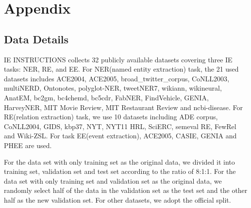 \section{Appendix}
\label{sec:appendix}
\subsection{Data Details}
\label{data details}
IE INSTRUCTIONS collects 32 publicly available datasets covering three IE tasks: NER, RE, and EE.
For NER(named entity extraction) task, the 21 used datasets includes ACE2004, ACE2005\cite{ACE2005DATASET}, broad\_twitter\_corpus\cite{broad_twitter_corpusDATASET}, CoNLL2003\cite{CoNLL03Dataset}, multiNERD\cite{multiNERDDATASET}, Ontonotes\cite{OntoNotesDataset}, polyglot-NER\cite{polyglot-NERDATASET}, tweetNER7\cite{tweetNER7DATASET}, wikiann\cite{wikiannDataset}, wikineural\cite{wikineuralDATASET}, AnatEM\cite{AnatEM}, bc2gm\cite{Kocaman2020BiomedicalNE}, bc4chemd\cite{bc4chemdDATASET}, bc5cdr\cite{Li2016BioCreativeVC}, FabNER\cite{Kumar2021FabNERIE}, FindVehicle\cite{FindVehicle}, GENIA\cite{GENIANERDATASET}, HarveyNER\cite{HarveyNERDATASET}, MIT Movie Review\cite{MITReviewDataset}, MIT Restaurant Review\cite{MITReviewDataset} and ncbi-disease\cite{ncbi-diseaseDATASET}. For RE(relation extraction) task, we use 10 datasets including ADE corpus\cite{ADEcorpusDATASET}, CoNLL2004\cite{Roth2004ALP}, GIDS\cite{Jat2018ImprovingDS}, kbp37\cite{kbp37DATASET}, NYT\cite{Riedel2010ModelingRA}, NYT11 HRL\cite{Takanobu2018AHF}, SciERC\cite{SciERCDATASET}, semeval RE\cite{Hendrickx2010SemEval2010T8}, FewRel\cite{FewRelDATASET} and Wiki-ZSL\cite{Wiki-ZSLDATASET}. For task EE(event extraction), ACE2005\cite{ACE2005DATASET}, CASIE\cite{Lu2021Text2EventCS}, GENIA\cite{Kim2003GENIAC} and PHEE\cite{Sun2022PHEEAD} are used. 

For the data set with only training set as the original data, we divided it into training set, validation set and test set according to the ratio of 8:1:1. For the data set with only training set and validation set as the original data, we randomly select half of the data in the validation set as the test set and the other half as the new validation set. For other datasets, we adopt the official split.

